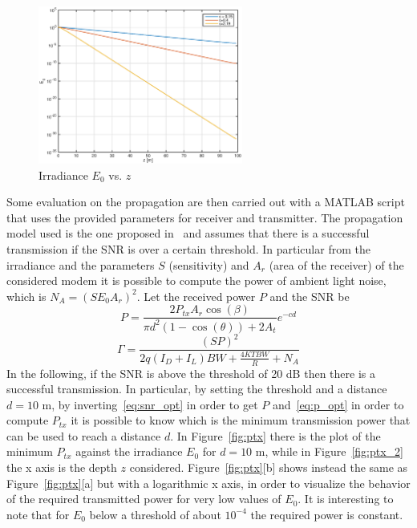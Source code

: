 \documentclass[10pt]{article}
\begin{document}
\begin{figure}[h!]
	\centering
	\includegraphics[width = 0.6\textwidth]{e0_z}
	\caption{Irradiance $E_0$ vs. $z$}
	\label{fig:e0zm}
\end{figure}

Some evaluation on the propagation are then carried out with a MATLAB script that uses the provided parameters for receiver and transmitter. The propagation model used is the one proposed in~\cite{optmodel} and assumes that there is a successful transmission if the SNR is over a certain threshold. In particular from the irradiance and the parameters $S$ (sensitivity) and $A_r$ (area of the receiver) of the considered modem it is possible to compute the power of ambient light noise, which is $N_A = (S E_0 A_r)^2$. Let the received power $P$ and the SNR be
\begin{equation}
	P = \frac{2 P_{tx} A_r \cos(\beta)}{\pi d^2 (1-\cos(\theta)) + 2 A_t}e^{-cd}
	\label{eq:p_opt}
\end{equation}
\begin{equation}
	\Gamma  = \frac{(SP)^2}{2q(I_D + I_L)BW + \frac{4KTBW}{R} + N_A}
	\label{eq:snr_opt}
\end{equation}
In the following, if the SNR is above the threshold of 20 dB then there is a successful transmission. In particular, by setting the threshold and a distance $d = 10$ m, by inverting~\eqref{eq:snr_opt} in order to get $P$ and~\eqref{eq:p_opt} in order to compute $P_{tx}$ it is possible to know which is the minimum transmission power that can be used to reach a distance $d$. In Figure~\ref{fig:ptx} there is the plot of the minimum $P_{tx}$ against the irradiance $E_0$ for $d = 10$ m, while in Figure~\ref{fig:ptx_2} the x axis is the depth $z$ considered. Figure~\ref{fig:ptx}[b] shows instead the same as Figure~\ref{fig:ptx}[a] but with a logarithmic x axis, in order to visualize the behavior of the required transmitted power for very low values of $E_0$. It is interesting to note that for $E_0$ below a threshold of about $10^{-4}$ the required power is constant.
\end{document}

